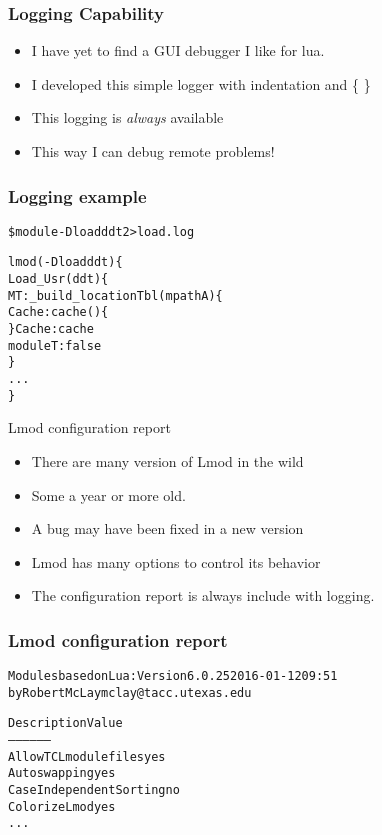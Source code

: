 \documentclass{beamer}
\begin{document}
\begin{frame}[fragile]
    \frametitle{Logging Capability}
  \begin{itemize}
    \item I have yet to find a GUI debugger I like for lua.
    \item I developed this simple logger with indentation and \{ \}
    \item This logging is \emph{\color{blue} always} available
    \item This way I can debug remote problems!
 \end{itemize}
\end{frame}    

\begin{frame}[fragile]
    \frametitle{Logging example}
    {\small
      \begin{alltt}
\$ module -D load ddt 2> load.log

lmod(-D load ddt)\{
  Load_Usr(ddt)\{
    MT:_build_locationTbl(mpathA)\{
      Cache:cache()\{
      \} Cache:cache
      moduleT: false
    \}
      ...
\}
      \end{alltt}
    }
\end{frame}    

\begin{frame}{Lmod configuration report}
  \begin{itemize}
    \item There are many version of Lmod in the wild
    \item Some a year or more old.
    \item A bug may have been fixed in a new version
    \item Lmod has many options to control its behavior
    \item The configuration report is always include with logging.
  \end{itemize}
\end{frame}

\begin{frame}[fragile]
    \frametitle{Lmod configuration report}
    {\small
      \begin{alltt}
Modules based on Lua: Version 6.0.25 2016-01-12 09:51
    by Robert McLay mclay@tacc.utexas.edu

Description                      Value
-----------                      -----
Allow TCL modulefiles            yes
Auto swapping                    yes
Case Independent Sorting         no
Colorize Lmod                    yes
...
      \end{alltt}
    }
\end{frame}    
\end{document}
